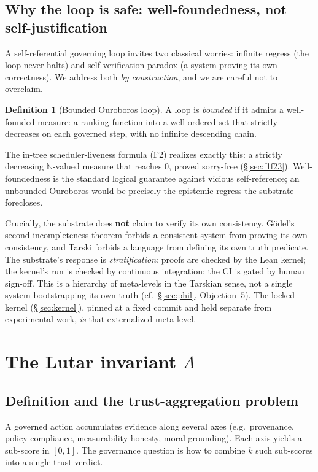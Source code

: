 \documentclass[11pt]{article}
\theoremstyle{plain}
\theoremstyle{definition}
\newtheorem{definition}[theorem]{Definition}
\theoremstyle{remark}
\newcommand{\La}{\Lambda}
\begin{document}
\subsection{Why the loop is safe: well-foundedness, not self-justification}
A self-referential governing loop invites two classical worries: infinite regress
(the loop never halts) and self-verification paradox (a system proving its own
correctness). We address both \emph{by construction}, and we are careful not to
overclaim.

\begin{definition}[Bounded Ouroboros loop]
A loop is \emph{bounded} if it admits a well-founded measure: a ranking function
into a well-ordered set that strictly decreases on each governed step, with no
infinite descending chain.
\end{definition}

The in-tree scheduler-liveness formula (F2) realizes exactly this: a strictly
decreasing $\mathbb{N}$-valued measure that reaches $0$, proved sorry-free
(\S\ref{sec:f1f23}). Well-foundedness is the standard logical guarantee against
vicious self-reference; an unbounded Ouroboros would be precisely the epistemic
regress the substrate forecloses.

Crucially, the substrate does \textbf{not} claim to verify its own consistency.
G\"odel's second incompleteness theorem forbids a consistent system from proving its
own consistency, and Tarski forbids a language from defining its own truth
predicate. The substrate's response is \emph{stratification}: proofs are checked by
the Lean kernel; the kernel's run is checked by continuous integration; the CI is
gated by human sign-off. This is a hierarchy of meta-levels in the Tarskian sense,
not a single system bootstrapping its own truth (cf.\ \S\ref{sec:phil}, Objection~5).
The locked kernel (\S\ref{sec:kernel}), pinned at a fixed commit and held separate
from experimental work, \emph{is} that externalized meta-level.

\section{The Lutar invariant $\La$}
\label{sec:lambda}

\subsection{Definition and the trust-aggregation problem}
A governed action accumulates evidence along several axes (e.g.\ provenance,
policy-compliance, measurability-honesty, moral-grounding). Each axis yields a
sub-score in $[0,1]$. The governance question is how to combine $k$ such sub-scores
into a single trust verdict.
\end{document}
